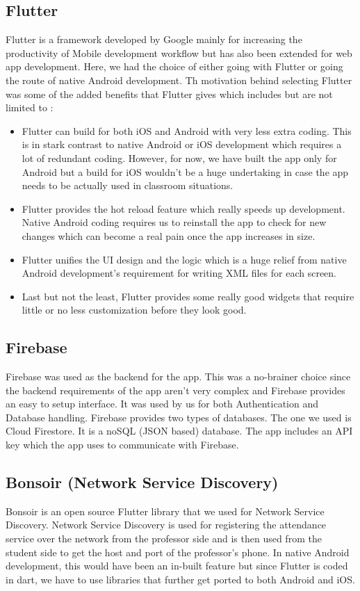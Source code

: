 \documentclass{article}
\begin{document}
\subsection{Flutter}
Flutter is a framework developed by Google mainly for increasing the productivity of Mobile development workflow but has also been extended for web app development. Here, we had the choice of either going with Flutter or going the route of native Android development. Th motivation behind selecting Flutter was some of the added benefits that Flutter gives which includes but are not limited to :
\begin{itemize}
    \item Flutter can build for both iOS and Android with very less extra coding. This is in stark contrast to native Android or iOS development which requires a lot of redundant coding. However, for now, we have built the app only for Android but a build for iOS wouldn't be a huge undertaking in case the app needs to be actually used in classroom situations.
    \item Flutter provides the hot reload feature which really speeds up development. Native Android coding requires us to reinstall the app to check for new changes which can become a real pain once the app increases in size.
    \item Flutter unifies the UI design and the logic which is a huge relief from native Android development's requirement for writing XML files for each screen.
    \item Last but not the least, Flutter provides some really good widgets that require little or no less customization before they look good.
\end{itemize}
\subsection{Firebase}
Firebase was used as the backend for the app. This was a no-brainer choice since the backend requirements of the app aren't very complex and Firebase provides an easy to setup interface. It was used by us for both Authentication and Database handling. Firebase provides two types of databases. The one we used is Cloud Firestore. It is a noSQL (JSON based) database. The app includes an API key which the app uses to communicate with Firebase.
\subsection{Bonsoir (Network Service Discovery)}
Bonsoir is an open source Flutter library that we used for Network Service Discovery. Network Service Discovery is used for registering the attendance service over the network from the professor side and is then used from the student side to get the host and port of the professor's phone. In native Android development, this would have been an in-built feature but since Flutter is coded in dart, we have to use libraries that further get ported to both Android and iOS.
\end{document}
